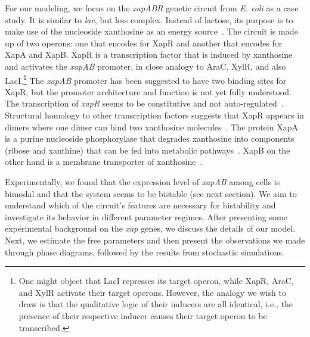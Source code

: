 \documentclass[10pt,letterpaper]{article}
\begin{document}
	For our modeling, we focus on the \emph{xapABR} genetic circuit from
	\emph{E. coli} as a case study. It is similar to \emph{lac}, but less
	complex. Instead of lactose, its purpose is to make use of the nucleoside
	xanthosine as an energy source~\cite{Buxton1980,Hammer-Jespersen1980}. The
	circuit is made up of two operons: one that encodes for XapR and another
	that encodes for XapA and XapB. XapR is a transcription factor
	that is induced by xanthosine and activates the \emph{xapAB} promoter,
	in close analogy to AraC, XylR, and also LacI.\footnote{One might object that LacI represses its target operon, while
	XapR, AraC, and XylR activate their target operons. However, the analogy
	we wish to draw is that the qualitative logic of their inducers are all
	identical, i.e., the presence of their respective inducer causes their
	target operon to be transcribed.} The \textit{xapAB} promoter has been suggested to have two binding sites for XapR\cite{Seeger1995},
	but the promoter architecture and function is not yet fully understood. The
	transcription of \emph{xapR} seems to be constitutive and not
	auto-regulated~\cite{Seeger1995}. Structural homology to other transcription
	factors suggests that XapR appears in dimers where one dimer can bind two
	xanthosine molecules~\cite{Joergensen1999}. The protein XapA is a purine
	nucleoside phosphorylase that degrades xanthosine into components (ribose
	and xanthine) that can be fed into metabolic
	pathways~\cite{Buxton1980,Hammer-Jespersen1980}. XapB on the other hand is a
	membrane transporter of xanthosine~\cite{Seeger1995,Norholm2001}.
	
	Experimentally, we found that the expression level of \emph{xapAB} among
	cells is bimodal and that the system seems to be
	bistable (see next section). We aim to understand which of the circuit's
	features are necessary for bistability and investigate its behavior in
	different parameter regimes. After presenting some experimental background on the \emph{xap} genes, we discuss the
	details of our model. Next, we estimate the free parameters and then present
	the observations we made through phase diagrams, followed by the results
	from stochastic simulations.
	
\end{document}
